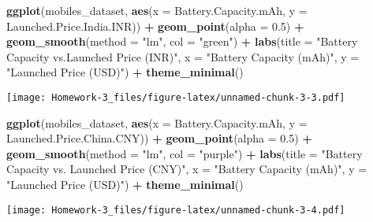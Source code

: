 \documentclass[
]{article}
\newenvironment{Shaded}{\begin{snugshade}}{\end{snugshade}}
\newcommand{\AttributeTok}[1]{\textcolor[rgb]{0.13,0.29,0.53}{#1}}
\newcommand{\FloatTok}[1]{\textcolor[rgb]{0.00,0.00,0.81}{#1}}
\newcommand{\FunctionTok}[1]{\textcolor[rgb]{0.13,0.29,0.53}{\textbf{#1}}}
\newcommand{\NormalTok}[1]{#1}
\newcommand{\SpecialCharTok}[1]{\textcolor[rgb]{0.81,0.36,0.00}{\textbf{#1}}}
\newcommand{\StringTok}[1]{\textcolor[rgb]{0.31,0.60,0.02}{#1}}
\begin{document}
\begin{Shaded}
\begin{Highlighting}[]
\FunctionTok{ggplot}\NormalTok{(mobiles\_dataset, }\FunctionTok{aes}\NormalTok{(}\AttributeTok{x =}\NormalTok{ Battery.Capacity.mAh, }\AttributeTok{y =}\NormalTok{ Launched.Price.India.INR)) }\SpecialCharTok{+}
  \FunctionTok{geom\_point}\NormalTok{(}\AttributeTok{alpha =} \FloatTok{0.5}\NormalTok{) }\SpecialCharTok{+}
  \FunctionTok{geom\_smooth}\NormalTok{(}\AttributeTok{method =} \StringTok{"lm"}\NormalTok{, }\AttributeTok{col =} \StringTok{"green"}\NormalTok{) }\SpecialCharTok{+}
  \FunctionTok{labs}\NormalTok{(}\AttributeTok{title =} \StringTok{"Battery Capacity vs.Launched Price (INR)"}\NormalTok{,}
       \AttributeTok{x =} \StringTok{"Battery Capacity (mAh)"}\NormalTok{,}
       \AttributeTok{y =} \StringTok{"Launched Price (USD)"}\NormalTok{) }\SpecialCharTok{+}
  \FunctionTok{theme\_minimal}\NormalTok{()}
\end{Highlighting}
\end{Shaded}

\texttt{[image: Homework-3\_files/figure-latex/unnamed-chunk-3-3.pdf]}

\begin{Shaded}
\begin{Highlighting}[]
\FunctionTok{ggplot}\NormalTok{(mobiles\_dataset, }\FunctionTok{aes}\NormalTok{(}\AttributeTok{x =}\NormalTok{ Battery.Capacity.mAh, }\AttributeTok{y =}\NormalTok{ Launched.Price.China.CNY)) }\SpecialCharTok{+}
  \FunctionTok{geom\_point}\NormalTok{(}\AttributeTok{alpha =} \FloatTok{0.5}\NormalTok{) }\SpecialCharTok{+}
  \FunctionTok{geom\_smooth}\NormalTok{(}\AttributeTok{method =} \StringTok{"lm"}\NormalTok{, }\AttributeTok{col =} \StringTok{"purple"}\NormalTok{) }\SpecialCharTok{+}
  \FunctionTok{labs}\NormalTok{(}\AttributeTok{title =} \StringTok{"Battery Capacity vs. Launched Price (CNY)"}\NormalTok{,}
       \AttributeTok{x =} \StringTok{"Battery Capacity (mAh)"}\NormalTok{,}
       \AttributeTok{y =} \StringTok{"Launched Price (USD)"}\NormalTok{) }\SpecialCharTok{+}
  \FunctionTok{theme\_minimal}\NormalTok{()}
\end{Highlighting}
\end{Shaded}

\texttt{[image: Homework-3\_files/figure-latex/unnamed-chunk-3-4.pdf]}
\end{document}
